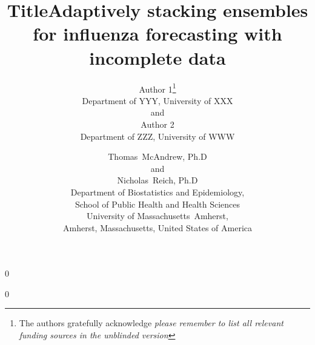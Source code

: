 \documentclass[12pt]{article}
\newcommand{\umassBiostat}{Department of Biostatistics and Epidemiology,\\
School of Public Health and Health Sciences\\
University of Massachusetts~Amherst,\\
Amherst, Massachusetts, United States of America}
\newcommand{\blind}{0}
\begin{document}
\def\spacingset#1{\renewcommand{\baselinestretch}%
{#1}\small\normalsize} \spacingset{1}

\blind
{
  \title{\bf Title}
  \author{Author 1\thanks{
    The authors gratefully acknowledge \textit{please remember to list all relevant funding sources in the unblinded version}}\hspace{.2cm}\\
    Department of YYY, University of XXX\\
    and \\
    Author 2 \\
    Department of ZZZ, University of WWW}
  \maketitle
} \fi

\blind
{ \bigskip
  \bigskip
  \bigskip
   \title{\LARGE\bf Adaptively stacking ensembles for influenza forecasting with incomplete data}
    \author{Thomas~McAndrew, Ph.D \\  
             and\\
             Nicholas~Reich, Ph.D \\
            \umassBiostat}
  \maketitle
} \fi
\end{document}
